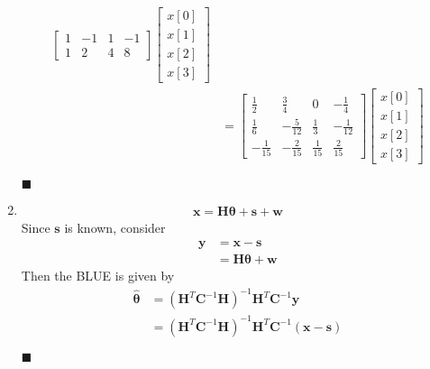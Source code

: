 \documentclass[a4paper,12pt]{article}
\begin{document}
\begin{enumerate}
\begin{align*}
\begin{bmatrix}
                1   &   -1  &   1   &   -1\\
                1   &   2   &   4   &   8
                \end{bmatrix}\begin{bmatrix}x[0]\\x[1]\\x[2]\\x[3]\end{bmatrix}\\
                &=\begin{bmatrix}
                \frac{1}{2}     &  \frac{3}{4}      &   0               &   -\frac{1}{4}\\
                \frac{1}{6}     &   -\frac{5}{12}   &   \frac{1}{3}     &   -\frac{1}{12}\\
                -\frac{1}{15}   &   -\frac{2}{15}   &   \frac{1}{15}    &   \frac{2}{15}
                \end{bmatrix}\begin{bmatrix}x[0]\\x[1]\\x[2]\\x[3]\end{bmatrix}
            \end{align*}
            \begin{flushright}
                $\blacksquare$
            \end{flushright}
        \item
            \begin{align*}
                \mathbf x=\mathbf H\bm\theta+\mathbf s+\mathbf w
            \end{align*}
            Since $\mathbf s$ is known, consider
            \begin{align*}
                \mathbf y &=\mathbf x-\mathbf s\\
                &=\mathbf H\bm\theta+\mathbf w
            \end{align*}
            Then the BLUE is given by
            \begin{align*}
                \hat{\bm\theta} &=(\mathbf H^T\mathbf C^{-1}\mathbf H)^{-1}\mathbf H^T\mathbf C^{-1}\mathbf y\\
                &=(\mathbf H^T\mathbf C^{-1}\mathbf H)^{-1}\mathbf H^T\mathbf C^{-1}(\mathbf x-\mathbf s)
            \end{align*}
            \begin{flushright}
                $\blacksquare$

\end{flushright}
\end{enumerate}
\end{document}
